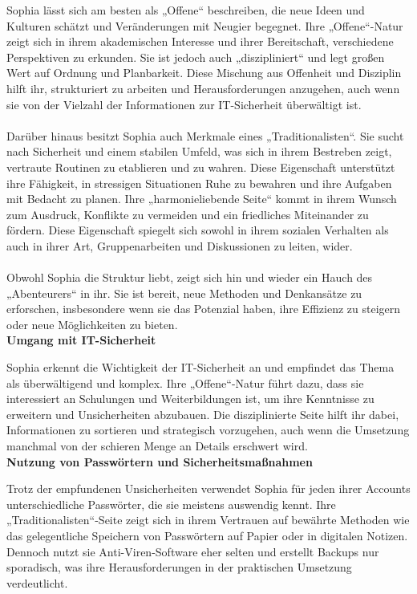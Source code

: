 \documentclass[german,report]{i1thesis}
\begin{document}
Sophia lässt sich am besten als „Offene“ beschreiben, die neue Ideen und Kulturen schätzt und Veränderungen mit Neugier begegnet. Ihre „Offene“-Natur zeigt sich in ihrem akademischen Interesse und ihrer Bereitschaft, verschiedene Perspektiven zu erkunden. Sie ist jedoch auch „diszipliniert“ und legt großen Wert auf Ordnung und Planbarkeit. Diese Mischung aus Offenheit und Disziplin hilft ihr, strukturiert zu arbeiten und Herausforderungen anzugehen, auch wenn sie von der Vielzahl der Informationen zur IT-Sicherheit überwältigt ist.\\
\\
Darüber hinaus besitzt Sophia auch Merkmale eines „Traditionalisten“. Sie sucht nach Sicherheit und einem stabilen Umfeld, was sich in ihrem Bestreben zeigt, vertraute Routinen zu etablieren und zu wahren. Diese Eigenschaft unterstützt ihre Fähigkeit, in stressigen Situationen Ruhe zu bewahren und ihre Aufgaben mit Bedacht zu planen. Ihre „harmonieliebende Seite“ kommt in ihrem Wunsch zum Ausdruck, Konflikte zu vermeiden und ein friedliches Miteinander zu fördern. Diese Eigenschaft spiegelt sich sowohl in ihrem sozialen Verhalten als auch in ihrer Art, Gruppenarbeiten und Diskussionen zu leiten, wider.\\
\\
Obwohl Sophia die Struktur liebt, zeigt sich hin und wieder ein Hauch des „Abenteurers“ in ihr. Sie ist bereit, neue Methoden und Denkansätze zu erforschen, insbesondere wenn sie das Potenzial haben, ihre Effizienz zu steigern oder neue Möglichkeiten zu bieten.\\

\textbf{Umgang mit IT-Sicherheit}

Sophia erkennt die Wichtigkeit der IT-Sicherheit an und empfindet das Thema als überwältigend und komplex. Ihre „Offene“-Natur führt dazu, dass sie interessiert an Schulungen und Weiterbildungen ist, um ihre Kenntnisse zu erweitern und Unsicherheiten abzubauen. Die disziplinierte Seite hilft ihr dabei, Informationen zu sortieren und strategisch vorzugehen, auch wenn die Umsetzung manchmal von der schieren Menge an Details erschwert wird.\\

\textbf{Nutzung von Passwörtern und Sicherheitsmaßnahmen}

Trotz der empfundenen Unsicherheiten verwendet Sophia für jeden ihrer Accounts unterschiedliche Passwörter, die sie meistens auswendig kennt. Ihre „Traditionalisten“-Seite zeigt sich in ihrem Vertrauen auf bewährte Methoden wie das gelegentliche Speichern von Passwörtern auf Papier oder in digitalen Notizen. Dennoch nutzt sie Anti-Viren-Software eher selten und erstellt Backups nur sporadisch, was ihre Herausforderungen in der praktischen Umsetzung verdeutlicht.\\
\end{document}
